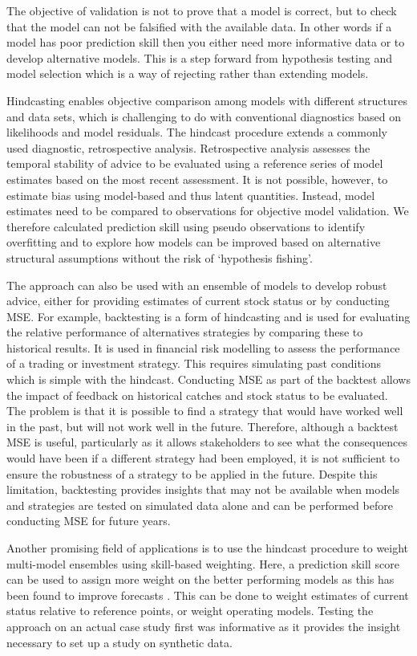 \documentclass[12pt,halfline,a4paper,nonumbib]{ouparticle}
\begin{document}
The objective of validation is not to prove that a model is correct, but to check that the model can not be falsified with the available data. In other words if a model has poor prediction skill then you either need more informative data or to develop alternative models. This is a step forward from hypothesis testing and model selection which is a way of rejecting rather than extending models. 

Hindcasting enables objective comparison among models with different structures and data sets, which is challenging to do with conventional diagnostics based on likelihoods and model residuals. The hindcast procedure extends a commonly used diagnostic, retrospective analysis. Retrospective analysis assesses the temporal stability of advice to be evaluated using a reference series of model estimates based on the most recent assessment. It is not possible, however, to estimate bias using model-based and thus latent quantities. Instead, model estimates need to be compared to observations for objective model validation. We therefore calculated prediction skill using pseudo observations to identify overfitting and to explore how models can be improved based on alternative structural assumptions without the risk of ‘hypothesis fishing’. 

The approach can also be used with an ensemble of models to develop robust advice, either for providing estimates of current stock status or by conducting MSE. For example, backtesting is a form of hindcasting and is used for evaluating the relative performance of alternatives strategies by comparing these to historical results. It is used in financial risk modelling to assess the performance of a trading or investment strategy. This requires simulating past conditions which is simple with the hindcast. Conducting MSE as part of the backtest allows the impact of feedback on historical catches and stock status to be evaluated. The problem is that it is possible to find a strategy that would have worked well in the past, but will not work well in the future. Therefore, although a backtest MSE is useful, particularly as it allows stakeholders to see what the consequences would have been if a different strategy had been employed, it is not sufficient to ensure the robustness of a strategy to be applied in the future. Despite this limitation, backtesting provides insights that may not be available when models and strategies are tested on simulated data alone and can be performed before conducting MSE for future years.

Another promising field of applications is to use the hindcast procedure to weight multi-model ensembles using skill-based weighting. Here, a prediction skill score can be used to assign more weight on the better performing models as this has been found to improve forecasts \parencite[e.g.][]{casanova2009weighting}. This can be done to weight estimates of current status relative to reference points, or weight operating models. Testing the approach on an actual case study first was informative as it provides the insight necessary to set up a study on synthetic data.
\end{document}

